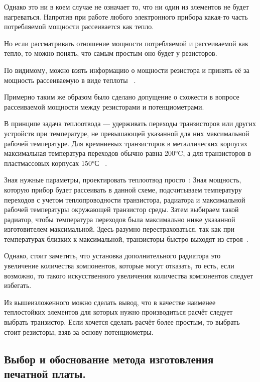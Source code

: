 Однако это ни в коем случае не означает то, что ни один из элементов
не будет нагреваться. Напротив при работе любого электронного прибора
какая-то часть потребляемой мощности рассеивается как тепло.

Но если рассматривать отношение мощности потребляемой и рассеиваемой
как тепло, то можно понять, что самым простым оно будет у резисторов.

По видимому, можно взять информацию о мощности резистора и принять её
за мощность рассеиваемую в виде теплоты
~\cite{HeatDissipatedResistors}.

Примерно таким же образом было сделано допущение о схожести в вопросе
рассеиваемой мощности между резисторами и потенциометрами.

В принципе задача теплоотвода — удерживать переходы транзисторов или
других устройств при температуре, не превышающей указанной для них
максимальной рабочей температуре. Для кремниевых транзисторов в
металлических корпусах максимальная температура переходов обычно равна
200°C, а для транзисторов в пластмассовых корпусах 150°С
~\cite{ArtOfElectronics2010}.

Зная нужные параметры,
проектировать теплоотвод просто~\cite{ArtOfElectronics2010}:
Зная мощность, которую прибор будет рассеивать в данной схеме,
подсчитываем температуру переходов с учетом теплопроводности
транзистора, радиатора и максимальной рабочей температуры окружающей
транзистор среды. Затем выбираем такой радиатор, чтобы температура
переходов была максимально ниже указанной изготовителем
максимальной. Здесь разумно перестраховаться, так как при температурах
близких к максимальной, транзисторы быстро выходят
из строя~\cite{ArtOfElectronics2010}.

Однако, стоит заметить, что установка дополнительного радиатора
это увеличение количества компонентов, которые могут отказать, то есть,
если возможно, то такого искусственного увеличения количества компонентов
следует избегать.

Из вышеизложенного можно сделать вывод, что в качестве наименее
теплостойких элементов для которых нужно производиться расчёт следует
выбрать транзистор. Если хочется сделать расчёт более простым, то
выбрать стоит резисторы, взяв за основу потенциометры.


\subsection{Выбор и обоснование
  метода изготовления печатной платы. }

